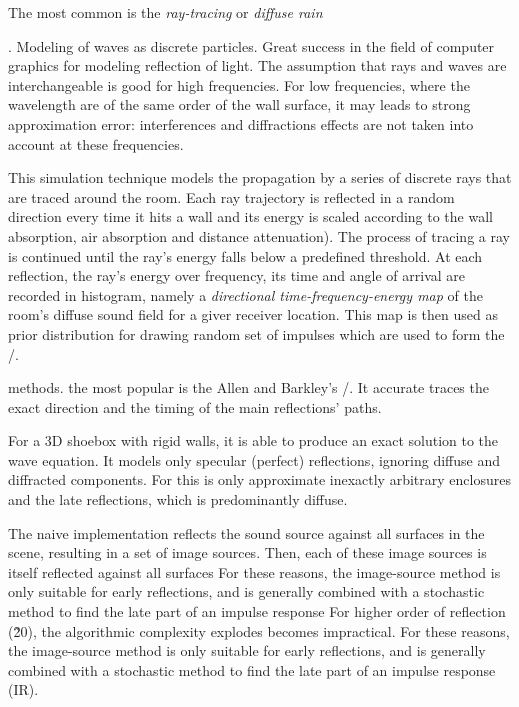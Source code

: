 The most common is the \textit{ray-tracing}\cite{Kulowski1985algorithmic} or \textit{diffuse rain}\cite{Schroeder2007fast, Heinz1993binaural, Wabniz2010}

.
Modeling of waves as discrete particles.
Great success in the field of computer graphics for modeling reflection of light.
The assumption that rays and waves are interchangeable is good for high frequencies.
For low frequencies, where the wavelength are of the same order of the wall surface, it may leads to strong approximation error:
interferences and diffractions effects are not taken into account at these frequencies\cite{Savioja2015goemetric}.

This simulation technique models the propagation by a series of discrete rays that are traced around the room.
Each ray trajectory is reflected in a random direction every time it hits a wall and its energy is scaled according to the wall absorption, air absorption and distance attenuation).
The process of tracing a ray is continued until the ray’s energy falls below a predefined threshold.
At each reflection, the ray's energy over frequency, its time and angle of arrival are recorded in histogram, namely a
\textit{directional time-frequency-energy map} of the room’s diffuse sound field for a giver receiver location.
This map is then used as prior distribution for drawing random set of impulses which are used to form the \RIR/.

 methods.
the most popular is the Allen and Barkley's \ISMf/\cite{allen1979image}.
It accurate traces the exact direction and the timing of the main reflections' paths.

For a 3D shoebox with rigid walls, it is able to produce an exact solution to the wave equation.
It models only specular (perfect) reflections, ignoring diffuse and diffracted components.
For this is only approximate inexactly arbitrary enclosures and the late reflections, which is predominantly diffuse.

The naive implementation reflects the sound source against all surfaces in the scene, resulting in a set of image sources. Then, each of these image sources is itself reflected against all surfaces
For these reasons, the image-source method is only suitable for early reflections, and is generally combined with a stochastic method to find the late part of an impulse response
For higher order of reflection (\~20), the algorithmic complexity explodes becomes impractical.
For these reasons, the image-source method is only suitable for early reflections, and is generally combined with a stochastic method to find the late part of an impulse response (IR).

